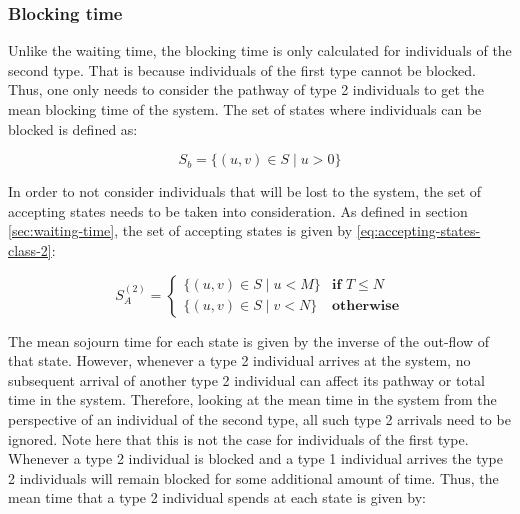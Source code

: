 \subsubsection{Blocking time}


Unlike the waiting time, the blocking time is only calculated for individuals of
the second type.  
That is because individuals of the first type cannot be blocked. 
Thus, one only needs to consider the pathway of type 2 individuals to get the 
mean blocking time of the system. 
The set of states where individuals can be blocked is defined as:

\begin{equation} \label{eq:set_of_blocking_states}
    S_b = \{(u,v) \in S \; | \; u > 0\}
\end{equation}
 
In order to not consider individuals that will be lost to the system, the set of 
accepting states needs to be taken into consideration. 
As defined in section \ref{sec:waiting-time}, the set of accepting states is 
given by \ref{eq:accepting-states-class-2}:

\begin{equation*}
    S_A^{(2)}=
    \begin{cases}
        \{(u, v) \in S \; | \; u < M \} & \textbf{if } T \leq N\\
        \{(u, v) \in S \; | \; v < N \} & \textbf{otherwise}
    \end{cases}
\end{equation*}


The mean sojourn time for each state is given by the inverse of the out-flow of
that state.
However, whenever a type 2 individual arrives at the system, no subsequent 
arrival of another type 2 individual can affect its pathway or total time in 
the system.
Therefore, looking at the mean time in the system from the perspective of an 
individual of the second type, all such type 2 arrivals need to be ignored.
Note here that this is not the case for individuals of the first type.
Whenever a type 2 individual is blocked and a type 1 individual arrives the type
2 individuals will remain blocked for some additional amount of time.
Thus, the mean time that a type 2 individual spends at each state is given by:

